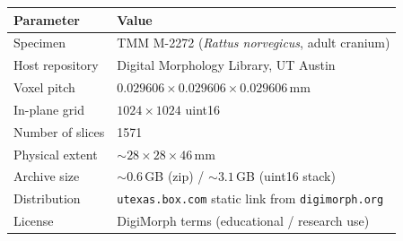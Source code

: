 \begin{tabular}{ll}
\toprule
Parameter & Value \\
\midrule
Specimen           & TMM M-2272 (\emph{Rattus norvegicus}, adult cranium) \\
Host repository    & Digital Morphology Library, UT Austin \\
Voxel pitch        & $0.029606 \times 0.029606 \times 0.029606$\,mm \\
In-plane grid      & $1024 \times 1024$ uint16 \\
Number of slices   & 1571 \\
Physical extent    & ${\sim}28 \times 28 \times 46$\,mm \\
Archive size       & ${\sim}0.6$\,GB (zip) / ${\sim}3.1$\,GB (uint16 stack) \\
Distribution       & \texttt{utexas.box.com} static link from
                     \texttt{digimorph.org} \\
License            & DigiMorph terms (educational / research use) \\
\bottomrule
\end{tabular}
